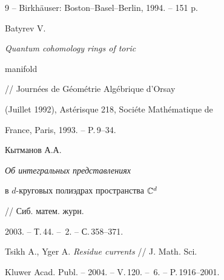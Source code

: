 \begin{thebibliography}{9}
-- Birkh\"auser: Boston--Basel--Berlin, 1994. -- 151 p.







Batyrev V. {\it Quantum cohomology rings of toric


manifold} // Journ\'ees de G\'eom\'etrie Alg\'ebrique d'Orsay


(Juillet 1992), Ast\'erisque 218, Soci\'ete Math\'ematique de


France, Paris, 1993.  -- P.\,9--34.







Кытманов А.А. {\it Об интегральных представлениях


в $d$-круговых полиэдрах пространства $\Bbb{C}^d$} // Сиб. матем. журн.


2003. -- Т.\,44. -- \No\,2. -- С.\,358--371.







Tsikh A., Yger A. {\it Residue currents} // J. Math. Sci.


Kluwer Acad. Publ. -- 2004. -- V.\,120. -- \No\,6. -- P.\,1916--2001.








\end{thebibliography}





\vskip 0.5cm












\label{end}









